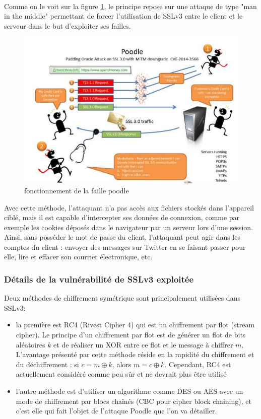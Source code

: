 \paragraph{}
Comme on le voit sur la figure \ref{poodle}, le principe repose sur une attaque de type "man in the middle" permettant de forcer l'utilisation de SSLv3 entre le client et le serveur dans le but d'exploiter ses failles. 

\begin{figure}[H]
\centering
\includegraphics[scale=0.9]{img/poodle.jpg}
\caption{fonctionnement de la faille poodle}
\label{poodle}
\end{figure}

Avec cette méthode, l'attaquant n’a pas accès aux fichiers stockés dans l’appareil ciblé, mais il est capable d'intercepter ses données de connexion, comme par exemple les cookies déposés dans le navigateur par un serveur lors d’une session. Ainsi, sans posséder le mot de passe du client, l'attaquant peut agir dans les comptes du client : envoyer des messages sur Twitter en se faisant passer pour elle, lire et effacer son courrier électronique, etc.

\subsubsection{Détails de la vulnérabilité de SSLv3 exploitée}

Deux méthodes de chiffrement symétrique sont principalement utilisées dans SSLv3:
\begin{itemize}
\item la première est RC4 (Rivest Cipher 4) qui est un chiffrement par flot (stream cipher). Le principe d'un chiffrement par flot est de générer un flot de bits aléatoires $k$ et de réaliser un XOR entre ce flot et le message à chiffrer $m$. L'avantage présenté par cette méthode réside en la rapidité du chiffrement et du déchiffrement : si $c = m \oplus k$, alors $m = c \oplus k$. Cependant, RC4 est actuellement considéré comme peu s\^ur et ne devrait plus \^etre utilisé
\item l'autre méthode est d'utiliser un algorithme comme DES ou AES avec un mode de chiffrement par blocs cha\^inés (CBC pour cipher block chaining), et c'est elle qui fait l'objet de l'attaque Poodle que l'on va détailler.
\end{itemize}

